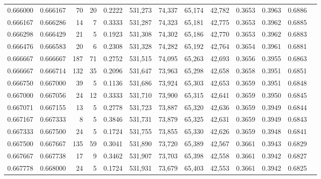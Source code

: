 \begin{tabular}{rrrrrrrrrrrrr}
0.666000 & 0.666167 &    70 &  20 &                                     0.2222 & 531,273 &  74,337 &  65,174 &  42,782 & 0.3653 & 0.3963 & 0.6886 \\
0.666167 & 0.666286 &    14 &   7 &                                     0.3333 & 531,287 &  74,323 &  65,181 &  42,775 & 0.3653 & 0.3962 & 0.6885 \\
0.666298 & 0.666429 &    21 &   5 &                                     0.1923 & 531,308 &  74,302 &  65,186 &  42,770 & 0.3653 & 0.3962 & 0.6883 \\
0.666476 & 0.666583 &    20 &   6 &                                     0.2308 & 531,328 &  74,282 &  65,192 &  42,764 & 0.3654 & 0.3961 & 0.6881 \\
0.666667 & 0.666667 &   187 &  71 &                                     0.2752 & 531,515 &  74,095 &  65,263 &  42,693 & 0.3656 & 0.3955 & 0.6863 \\
0.666667 & 0.666714 &   132 &  35 &                                     0.2096 & 531,647 &  73,963 &  65,298 &  42,658 & 0.3658 & 0.3951 & 0.6851 \\
0.666750 & 0.667000 &    39 &   5 &                                     0.1136 & 531,686 &  73,924 &  65,303 &  42,653 & 0.3659 & 0.3951 & 0.6848 \\
0.667000 & 0.667056 &    24 &  12 &                                     0.3333 & 531,710 &  73,900 &  65,315 &  42,641 & 0.3659 & 0.3950 & 0.6845 \\
0.667071 & 0.667155 &    13 &   5 &                                     0.2778 & 531,723 &  73,887 &  65,320 &  42,636 & 0.3659 & 0.3949 & 0.6844 \\
0.667167 & 0.667333 &     8 &   5 &                                     0.3846 & 531,731 &  73,879 &  65,325 &  42,631 & 0.3659 & 0.3949 & 0.6843 \\
0.667333 & 0.667500 &    24 &   5 &                                     0.1724 & 531,755 &  73,855 &  65,330 &  42,626 & 0.3659 & 0.3948 & 0.6841 \\
0.667500 & 0.667667 &   135 &  59 &                                     0.3041 & 531,890 &  73,720 &  65,389 &  42,567 & 0.3661 & 0.3943 & 0.6829 \\
0.667667 & 0.667738 &    17 &   9 &                                     0.3462 & 531,907 &  73,703 &  65,398 &  42,558 & 0.3661 & 0.3942 & 0.6827 \\
0.667778 & 0.668000 &    24 &   5 &                                     0.1724 & 531,931 &  73,679 &  65,403 &  42,553 & 0.3661 & 0.3942 & 0.6825 \\

\end{tabular}
